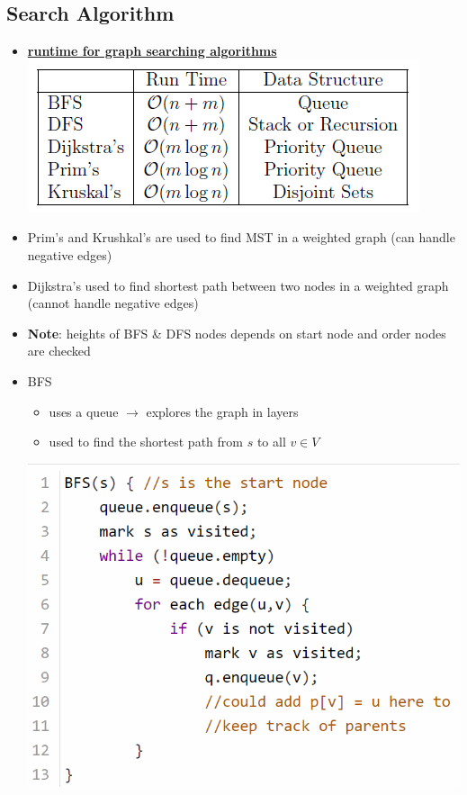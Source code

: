 \subsection*{Search Algorithm}
\begin{itemize}
    \item \ul{\textbf{runtime for graph searching algorithms}} \\
    \includegraphics[scale = 0.9]{pictures/runtime graph algo.png}
    \item Prim's and Krushkal's are used to find MST in a weighted graph (can handle negative edges)
    \item Dijkstra's used to find shortest path between two nodes in a weighted graph (cannot handle negative edges)
    \item \textbf{Note}: heights of BFS \& DFS nodes depends on start node and order nodes are checked
    \vfill\null \columnbreak
    \item BFS
    \begin{itemize}[leftmargin = 1em]
        \item uses a queue $\rightarrow$ explores the graph in layers
        \item used to find the shortest path from $s$ to all $v \in V$
    \end{itemize}
    \includegraphics[scale = 0.6]{pictures/BFS code.png} 

\end{itemize}

